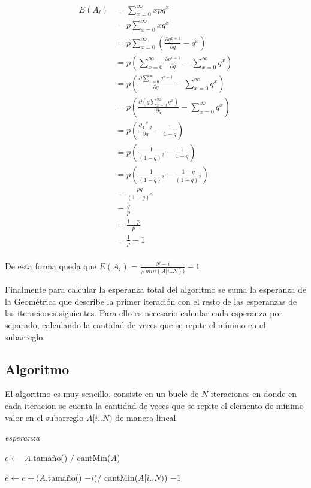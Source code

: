 \[ \begin{aligned}
    E(A_i)  &= \sum_{x = 0}^{\infty}{x p q^x} \\
    		&= p \sum_{x = 0}^{\infty}{x q^x} \\
    		&= p \sum_{x = 0}^{\infty}{\left( \frac{\partial q^{x + 1}}{\partial q} - q^x \right)} \\
    		&= p \left( \sum_{x = 0}^{\infty}{\frac{\partial q^{x + 1}}{\partial q}} - \sum_{x = 0}^{\infty}{q^x} \right) \\
    		&= p \left( \frac{\partial \sum_{x = 0}^{\infty}{q^{x + 1}}}{\partial q} - \sum_{x = 0}^{\infty}{q^x} \right) \\
    		&= p \left( \frac{\partial (q \sum_{x = 0}^{\infty}{q^x})}{\partial q} - \sum_{x = 0}^{\infty}{q^x} \right) \\
    		&= p \left( \frac{\partial \frac{q}{1 - q}}{\partial q} - \frac{1}{1 - q} \right) \\
    		&= p \left( \frac{1}{(1 - q)^2} - \frac{1}{1 - q} \right) \\
    		&= p \left( \frac{1}{(1 - q)^2} - \frac{1 - q}{(1 - q)^2} \right) \\
    		&= \frac{pq}{(1 - q)^2} \\
    		&= \frac{q}{p} \\
    		&= \frac{1 - p}{p} \\
    		&= \frac{1}{p} - 1 \\
\end{aligned} \]

De esta forma queda que $E(A_i) = \frac{N - i}{\#min(A[i..N))} - 1$

Finalmente para calcular la esperanza total del algoritmo se suma la esperanza
de la Geométrica que describe la primer iteración con el resto de las
esperanzas de las iteraciones siguientes. Para ello es necesario calcular
cada esperanza por separado, calculando la cantidad de veces que se repite el
mínimo en el subarreglo.

\subsection{Algoritmo}

El algoritmo es muy sencillo, consiste en un bucle de $N$ iteraciones en donde en cada iteracion se cuenta la cantidad de veces que se repite el elemento de mínimo valor en el subarreglo $A[i..N)$ de manera lineal.

\bigskip

\begin{algorithm}[H]
	\caption{\textit{esperanza}}

	$e \gets$ $A$.tamaño() $/$ cantMin($A$) \;

     {
		$e \gets e + (A$.tamaño() $- i) /$ cantMin($A[i..N)$) $- 1$ \;
	}

\end{algorithm}

